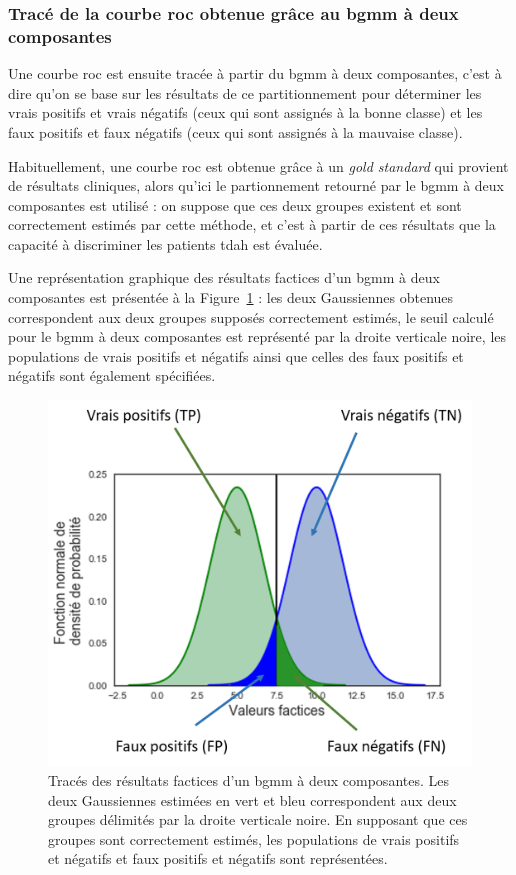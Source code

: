 \subsubsection{Tracé de la courbe \gls{roc} obtenue grâce au \gls{bgmm} à deux composantes}
Une courbe \gls{roc} est ensuite tracée à partir du \gls{bgmm} à deux composantes, c'est à dire qu'on se base sur les résultats de ce partitionnement pour déterminer les 
vrais positifs et vrais négatifs (ceux qui sont assignés à la bonne classe) et les faux positifs et faux négatifs (ceux qui sont assignés à la mauvaise classe). 

Habituellement, une courbe \gls{roc}
est obtenue grâce à un \textit{gold standard} qui provient de résultats cliniques, alors qu'ici le partionnement retourné par le \gls{bgmm} à deux composantes est utilisé : on suppose 
que ces deux groupes existent et sont correctement estimés par cette méthode, et c'est à partir de ces résultats que la capacité à discriminer les patients \gls{tdah} est évaluée.

Une représentation graphique des résultats factices d'un \gls{bgmm} à deux composantes est présentée à la Figure~\ref{Figure:tbr_bgmm_example} : les deux Gaussiennes obtenues correspondent 
aux deux groupes supposés correctement estimés,
le seuil calculé pour le \gls{bgmm} à deux composantes est représenté par la droite verticale noire, les populations de vrais positifs et négatifs ainsi que celles des faux positifs 
et négatifs sont également spécifiées. 

\begin{figure}[h!]
  \centering
	\includegraphics[width=0.7\linewidth]{figures/chapter-4/tbr-bgmm-example} 
  \caption{Tracés des résultats factices d'un \gls{bgmm} à deux composantes. Les deux Gaussiennes estimées en vert et bleu correspondent aux deux groupes délimités par la droite
	verticale noire. En supposant que ces groupes sont correctement estimés, les populations de vrais positifs et négatifs et faux positifs et négatifs sont représentées.} 
	\label{Figure:tbr_bgmm_example} 
\end{figure}

